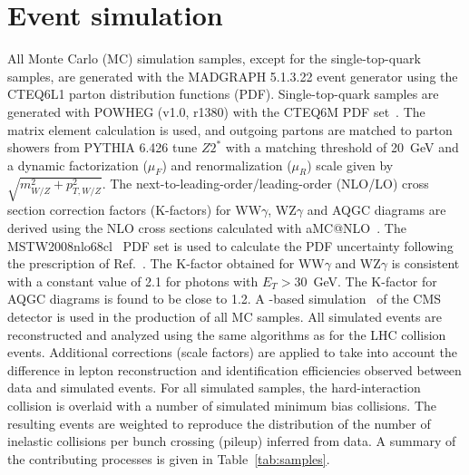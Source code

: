 

\section{Event simulation }
\label{sec:mc}
All Monte Carlo (MC) simulation samples, except for the single-top-quark samples, are generated with the
MADGRAPH 5.1.3.22 \cite{MadGraph} event generator using the CTEQ6L1 parton
distribution functions (PDF). Single-top-quark samples are generated with {\sc POWHEG} (v1.0, r1380)\cite{Alioli:2009je,Re:2010bp} with the CTEQ6M PDF 
set~\cite{Pumplin:2002vw,Nadolsky:2008zw}. 
The matrix element calculation is used, and outgoing partons are matched to parton showers from
{\sc PYTHIA} 6.426 \cite{pythia} tune $Z2^*$ \cite{Collaboration:2012tb} with
a matching threshold of 20~GeV and a dynamic factorization ($\mu_F$) and
renormalization ($\mu_R$) scale given by $\sqrt{m^{2}_{W/Z} + p^{2}_{T,W/Z}}$. 
The next-to-leading-order/leading-order (NLO/LO) cross section correction factors (K-factors) for WW$\gamma$, WZ$\gamma$ and AQGC diagrams 
are derived using the NLO cross sections calculated with {\sc aMC@NLO}~\cite{Frixione:2002ik}. The MSTW2008nlo68cl~\cite{Martin:2009iq} PDF 
set is used to calculate the PDF uncertainty following the prescription of Ref.~\cite{Frederix:2011ss}. 
The K-factor obtained for WW$\gamma$ and WZ$\gamma$ is consistent with a
constant value of 2.1 for photons with $E_{T}>30$~GeV. The K-factor for AQGC diagrams is
found to be close to 1.2.
A \GEANTfour-based simulation~\cite{GEANT4} of the CMS
detector is used in the production of all MC samples. All simulated events are reconstructed and analyzed using the same algorithms as for the LHC 
collision events. Additional corrections (scale factors) are applied to take into account the difference in lepton 
reconstruction and identification efficiencies observed between data and simulated events.
For all simulated samples, the hard-interaction collision is overlaid with a number of simulated
minimum bias collisions. The resulting events are weighted to reproduce the distribution of
the number of inelastic collisions per bunch crossing (pileup) inferred from data.
A summary of the contributing processes is given in Table~\ref{tab:samples}.

